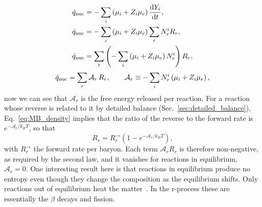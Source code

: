 \begin{align}
  \dot q_{\rm nuc}&=-\sum_i\left(\mu_i+Z_i\mu_e\right)\frac{\mathrm{d}Y_i}{\mathrm{d}t},\\
  \dot q_{\rm nuc}&=-\sum_i\left(\mu_i+Z_i\mu_e\right)\sum_rN^i_rR_r,\\
  \dot q_{\rm nuc}&=\sum_r\left(-\sum_i\left(\mu_i+Z_i\mu_e\right)N^i_r\right)R_r,
\end{align}
\begin{equation}\label{eq:affinity}
  \dot q_{\rm nuc}=\sum_r\mathcal{A}_r\,R_r,\qquad \mathcal{A}_r\equiv-\sum_iN^i_r\left(\mu_i+Z_i\mu_e\right),
\end{equation}
now we can see that $\mathcal{A}_r$ is the free energy released per reaction.
For a reaction whose reverse is related to it by detailed balance (Sec.~\ref{sec:detailed_balance}), Eq.~\ref{eq:MB_density} implies that the ratio of the reverse to the forward rate is $e^{-\mathcal{A}_r/k_BT}$, so that
\begin{equation}\label{eq:net_rate}
  R_r=R_r^{\rightarrow}\left(1-e^{-\mathcal{A}_r/k_BT}\right),
\end{equation}
with $R_r^{\rightarrow}$ the forward rate per baryon.
Each term $\mathcal{A}_rR_r$ is therefore non-negative, as required by the second law, and it vanishes for reactions in equilibrium, $\mathcal{A}_r=0$.
One interesting result here is that reactions in equilibrium produce no entropy even though they change the composition as the equilibrium shifts.
Only reactions out of equilibrium heat the matter~\cite{reichert_nuclear_2023}.
In the r-process these are essentially the $\beta$ decays and fission.


